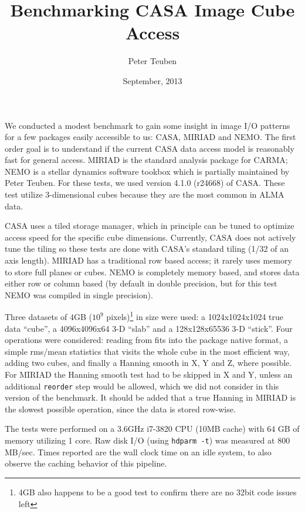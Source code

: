 \documentclass{article}
\title{Benchmarking CASA Image Cube Access}
\author{Peter Teuben}
\date{September, 2013}
\begin{document}
\maketitle


We conducted a modest benchmark to gain some insight in image
I/O patterns for a few packages easily accessible to us: CASA,
MIRIAD and NEMO. The first order goal is to understand if the
current CASA data access model is reasonably fast for general
access.
MIRIAD is the standard analysis package for
CARMA; NEMO is a stellar dynamics software tookbox which is
partially maintained by Peter Teuben. For these tests, we
used version 4.1.0 (r24668) of CASA. These test utilize 3-dimensional cubes
because they are the most common in ALMA data.

CASA uses a tiled storage manager, which in principle
can be tuned to optimize access speed for the specific
cube dimensions.  Currently, CASA does not actively tune
the tiling so these tests are done with CASA's standard tiling
(1/32 of an axis length).
MIRIAD has a traditional row based access; it rarely
uses memory to store full planes or cubes. NEMO is completely
memory based, and stores data either row or column based
(by default in double precision, but for this test NEMO was compiled 
in single precision).

Three datasets of 4GB ($10^9$ pixels)\footnote{4GB also happens to
be a good test to confirm there are no 32bit code issues left}
in size were used:
a 1024x1024x1024 true data ``cube'',
a 4096x4096x64 3-D ``slab'' and a 128x128x65536 3-D ``stick''.
Four operations were considered:  reading from fits
into the package native format,
a simple rms/mean statistics that visits the whole cube in the
most efficient way, adding two cubes, and finally
a Hanning smooth in X, Y and Z, where possible.  For MIRIAD
the Hanning smooth test had to be skipped in X and Y, unless
an additional {\tt reorder} step would be allowed, which we did
not consider in this version of the benchmark.
It should be added that a true Hanning in MIRIAD
is the slowest possible operation, since the data is stored
row-wise.

The tests were performed on a 3.6GHz i7-3820 CPU (10MB cache) with 64
GB of memory utilizing 1 core.  Raw disk I/O (using {\tt hdparm -t})
was measured at 800 MB/sec. Times reported are the wall clock time on
an idle system, to also observe the caching behavior of this pipeline.
\end{document}
